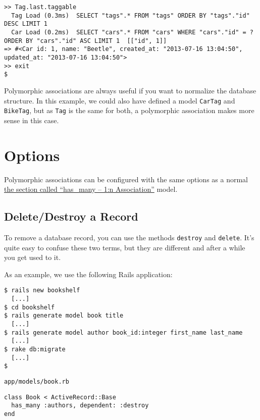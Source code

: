 \documentclass[a4paper]{book}
\newcounter{tab}[chapter]
\begin{document}
\begin{shaded}\begin{verbatim}
>> Tag.last.taggable
  Tag Load (0.3ms)  SELECT "tags".* FROM "tags" ORDER BY "tags"."id" DESC LIMIT 1
  Car Load (0.2ms)  SELECT "cars".* FROM "cars" WHERE "cars"."id" = ? ORDER BY "cars"."id" ASC LIMIT 1  [["id", 1]]
=> #<Car id: 1, name: "Beetle", created_at: "2013-07-16 13:04:50", updated_at: "2013-07-16 13:04:50">
>> exit
$
\end{verbatim}\end{shaded}

Polymorphic associations are always useful if you want to normalize the database structure. In this example, we could also have defined a model \texttt{CarTag} and \texttt{BikeTag}, but as \texttt{Tag} is the same for both, a polymorphic association makes more sense in this case.

\section{Options}\label{options-2}

Polymorphic associations can be configured with the same options as a normal \hyperref[activerecordux5fhasux5fmany]{the section called “has\_many -- 1:n Association”} model.

\subsection{Delete/Destroy a Record}\label{deletedestroy-a-record}

To remove a database record, you can use the methods \texttt{destroy} and \texttt{delete}. It's quite easy to confuse these two terms, but they are different and after a while you get used to it.

As an example, we use the following Rails application:

\begin{shaded}\begin{verbatim}
$ rails new bookshelf
  [...]
$ cd bookshelf
$ rails generate model book title
  [...]
$ rails generate model author book_id:integer first_name last_name
  [...]
$ rake db:migrate
  [...]
$
\end{verbatim}\end{shaded}

\texttt{app/models/book.rb}

\begin{shaded}\begin{verbatim}
class Book < ActiveRecord::Base
  has_many :authors, dependent: :destroy
end
\end{verbatim}\end{shaded}
\end{document}
